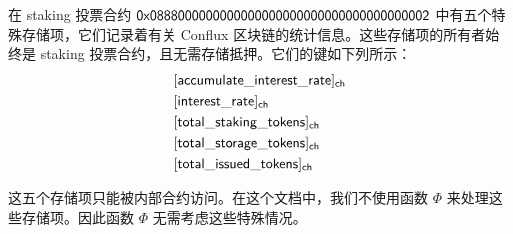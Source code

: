 在 staking 投票合约 ${\sf 0x0888000000000000000000000000000000000002}$ 中有五个特殊存储项，它们记录着有关 Conflux 区块链的统计信息。这些存储项的所有者始终是 staking 投票合约，且无需存储抵押。它们的键如下列所示：
\begin{align}
	& \sf [accumulate\char`_interest\char`_rate]_{\sf ch} \\ 
	& \sf [interest\char`_rate]_{\sf ch} \\
    & \sf [total\char`_staking\char`_tokens]_{\sf ch} \\
    & \sf [total\char`_storage\char`_tokens]_{\sf ch} \\
    & \sf [total\char`_issued\char`_tokens]_{\sf ch} 
\end{align}

这五个存储项只能被内部合约访问。在这个文档中，我们不使用函数 $\Phi$ 来处理这些存储项。因此函数 $\Phi$ 无需考虑这些特殊情况。
